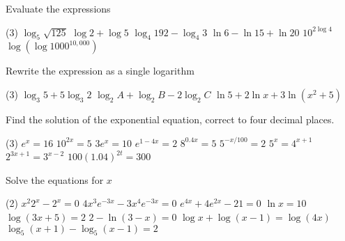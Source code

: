 \begin{Exercise}[title={Logarithmic Functions},label=exLogFunctions]
\Question Evaluate the expressions
\begin{tasks}(3)
	\task $\log _{5} \sqrt{125}$	%
	\task $\log  2 +\log  5$		%
	\task $\log _{4} 192 -\log _{4} 3$	%
	\task $\ln  6 -\ln  15 +\ln  20$	%
	\task $10^{2 \log  4}$ 			%
	\task $\log  \left (\log  1000^{10,000}\right )$	%
\end{tasks}
	
	\Question Rewrite the expression as a single logarithm
	\begin{tasks}(3)
		\task $\log _{3} 5 +5 \log _{3} 2$	%
		\task $\log _{2} A +\log _{2} B -2 \log _{2} C$%
		\task $\ln  5 +2 \ln  x +3 \ln  \left (x^{2} +5\right )$ %
		\end{tasks}
	
	\Question Find the solution of the exponential equation, correct to four decimal places. 
	\begin{tasks}(3)
		\task $e^{x} =16$ 		%
		\task $10^{2 x} =5$ 	%
		\task $3 e^{x} =10$ 	%
		\task $e^{1 -4 x} =2$ 	%
		\task $8^{0.4 x} =5$ 	%
		\task $5^{ -x/100} =2$	%
		\task $5^{x} =4^{x +1}$ %
		\task $2^{3 x +1} =3^{x -2}$ 	%
		\task $100 \left (1.04\right )^{2 t} =300$	%
		\end{tasks}
	
		\Question Solve the equations for $x$ 
	\begin{tasks}(2)
		\task $x^{2} 2^{x} -2^{x} =0$ %
		\task $4 x^{3} e^{ -3 x} -3 x^{4} e^{ -3 x} =0$%
		\task $e^{4 x} +4 e^{2 x} -21 =0$ %
		\task $\ln  x =10$ %
		\task $\log  \left (3 x +5\right ) =2$%
		\task $2 -\ln  \left (3 -x\right ) =0$%
		\task $\log  x +\log  \left (x -1\right ) =\log  \left (4 x\right )$ %
		\task $\log _{5} \left (x +1\right ) -\log _{5} \left (x -1\right ) =2$ %
\end{tasks}	
\end{Exercise}	
